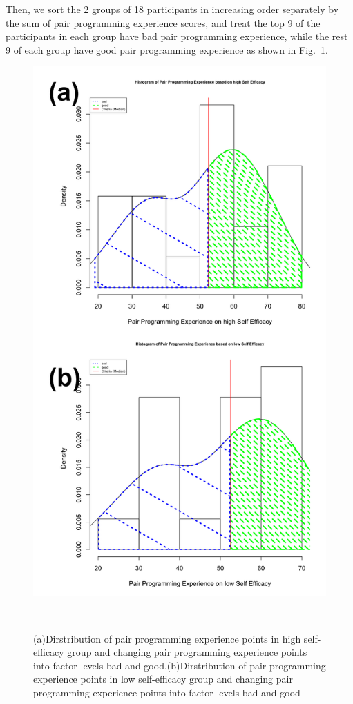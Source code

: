 \documentclass{sigchi}
\begin{document}
Then, we sort the 2 groups of 18 participants in increasing order separately by the sum of pair programming experience scores, and treat the top 9 of the participants in each group have bad pair programming experience, while the rest 9 of each group have good pair programming experience as shown in Fig.~\ref{fig:figure2}. 

\begin{figure}
\centering
  \includegraphics[width=0.8\columnwidth]{figures/hist2}
  \caption{(a)Dirstribution of pair programming experience points in high self-efficacy group and changing pair programming experience points  into  factor levels bad and good.(b)Dirstribution of pair programming experience points in low self-efficacy group and changing pair programming experience points  into  factor levels bad and good }~\label{fig:figure2}
\end{figure}
\end{document}
